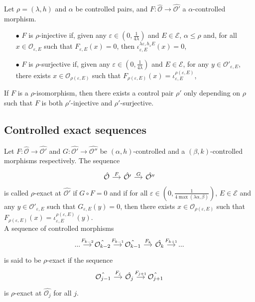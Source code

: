 \begin{definition}
Let $\rho=(\lambda,h)$ and $\alpha$ be controlled pairs, and $F : \hat{\mathcal O} \rightarrow \hat{\mathcal O'}$ a $\alpha$-controlled morphism. 
\begin{itemize}
\item[$\bullet$] $F$ is $\rho$-injective if, given any $\varepsilon \in (0,\frac{1}{4\lambda})$ and $E\in \mathcal E$, $\alpha\leq \rho$ and, for all $x\in \mathcal O_{\varepsilon, E}$ such that $F_{\varepsilon, E}(x)=0$, then $\iota_{\varepsilon, E}^{\lambda\varepsilon, h_\varepsilon E}(x)=0$,
\item[$\bullet$] $F$ is $\rho$-surjective if, given any $\varepsilon \in (0,\frac{1}{4\lambda})$ and $E\in \mathcal E$, for any $y\in \mathcal O' _{\varepsilon, E}$, there exists $x\in \mathcal O_{\rho(\varepsilon,E)}$ such that $F_{\rho(\varepsilon,E)}(x)= \iota_{\varepsilon,E}^{\rho(\varepsilon,E)}$,
\end{itemize}
\end{definition}

\begin{rk}
If $F$ is a $\rho$-isomorphism, then there exists a control pair $\rho'$ only depending on $\rho$ such that $F$ is both $\rho'$-injective and $\rho'$-surjective.
\end{rk}
\subsection{Controlled exact sequences}

\begin{definition}
Let $F : \hat{\mathcal O}\rightarrow \hat{\mathcal O'}$ and $G : \hat{\mathcal O'}\rightarrow \hat{\mathcal O''}$ be $(\alpha,h)$-controlled and a $(\beta,k)$-controlled morphisms respectively. The sequence
\[\begin{tikzcd}[column sep = small] \hat{\mathcal O} \arrow{r}{F} & \hat{\mathcal O'} \arrow{r}{G} & \hat{\mathcal O''} \end{tikzcd}\]
is called $\rho$-exact at $\hat{\mathcal O'}$ if $G\circ F=0$ and if for all $\varepsilon\in (0,\frac{1}{4 \max (\lambda \alpha,\beta)})$, $E\in\mathcal E$ and any $y\in \mathcal O'_{\varepsilon,E}$ such that $G_{\varepsilon,E}(y) = 0$, then there exists $x\in \mathcal O_{\rho(\varepsilon,E)}$ such that $F_{\rho(\varepsilon,E)}(x)=\iota_{\varepsilon,E}^{\rho(\varepsilon,E)} (y)$.\\
A sequence of controlled morphisms 
\[\begin{tikzcd}[column sep = small] ... \arrow{r}{F_{k-2}} & \hat{\mathcal O_{k-2}} \arrow{r}{F_{k-1}} & \hat{\mathcal O_{k-1}} \arrow{r}{F_k} & \hat{\mathcal O_k} \arrow{r}{F_{k+1}} & ... \end{tikzcd}\] 
is said to be $\rho$-exact if the sequence
\[\begin{tikzcd}[column sep = small] \hat{\mathcal O_{j-1}} \arrow{r}{F_{j}} & \hat{\mathcal O_{j}} \arrow{r}{F_{j+1}} & \hat{\mathcal O_{j+1}} \end{tikzcd}\]
is $\rho$-exact at $\hat{\mathcal O_j}$ for all $j$.
\end{definition}

